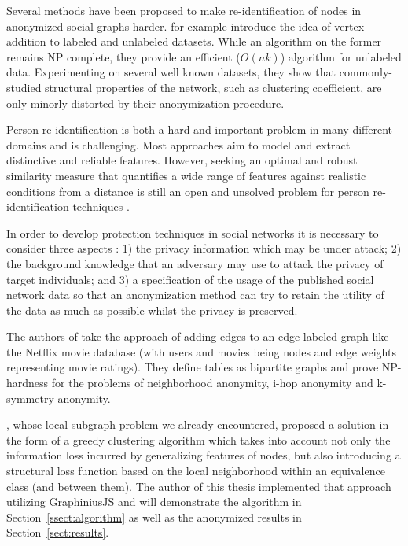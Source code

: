 \documentclass{llncs}
\begin{document}
Several methods have been proposed to make re-identification of nodes in anonymized social graphs harder.	\cite{chester2011k} for example introduce the idea of vertex addition to labeled and unlabeled datasets. While an algorithm on the former remains NP complete, they provide an efficient ($O(nk)$) algorithm for unlabeled data. Experimenting on several well known datasets, they show that commonly-studied structural properties of the network, such as clustering coefficient, are only minorly distorted by their anonymization procedure.

Person re-identification is both a hard and important problem in many different domains and is challenging. Most approaches aim to model and extract distinctive and reliable features. However, seeking an optimal and robust similarity measure that quantifies a wide range of features against realistic conditions from a distance is still an open and unsolved problem for person re-identification techniques \cite{Zheng:2013:reidentification}. 

In order to develop protection techniques in social networks it is necessary to consider three aspects \cite{Zhou:2008:SurveyAnonNetwork}: 1) the privacy information which may be
under attack; 2) the background knowledge that an adversary may use to attack the privacy
of target individuals; and 3) a specification of the usage of the published social network data so that an anonymization method can try to retain the utility of the data as much as possible whilst the privacy is preserved. 

The authors of \cite{kapron2011social} take the approach of adding edges to an edge-labeled graph like the Netflix movie database (with users and movies being nodes and edge weights representing movie ratings). They define tables as bipartite graphs and prove NP-hardness for the problems of neighborhood anonymity, i-hop anonymity and k-symmetry anonymity.

\cite{campan2009data}, whose local subgraph problem we already encountered, proposed a solution in the form of a greedy clustering algorithm which takes into account not only the information loss incurred by generalizing features of nodes, but also introducing a structural loss function based on the local neighborhood within an equivalence class (and between them). The author of this thesis implemented that approach utilizing GraphiniusJS and will demonstrate the algorithm in Section~\ref{ssect:algorithm} as well as the anonymized results in Section~\ref{sect:results}.
\end{document}
